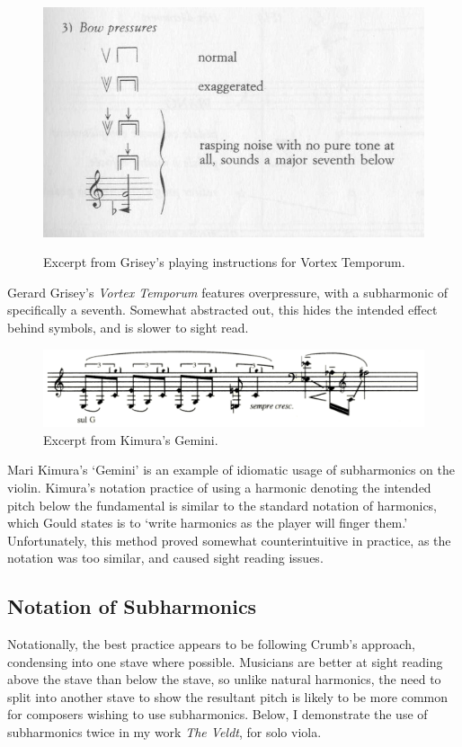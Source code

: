 \begin{figure}
    \includegraphics[width=\linewidth]{./resources/griseyVortexTemporum.jpg}
    \caption{Excerpt from Grisey's playing instructions for Vortex Temporum.}\autocite{griseyVortexTemporum}
\label{fig:Excerpt from Grisey's playing instructions for Vortex Temporum}
  \end{figure}
Gerard Grisey's \emph{Vortex Temporum} features overpressure, with a subharmonic of specifically a seventh. Somewhat abstracted out, this hides the intended effect behind symbols, and is slower to sight read.

\begin{figure}
    \includegraphics[width=\linewidth]{./resources/kimura_gemini.png}
    \caption{Excerpt from Kimura's Gemini.}
\label{fig:Excerpt from Kimura's Gemini}
  \end{figure}
  Mari Kimura's `Gemini' is an example of idiomatic usage of subharmonics on the violin. Kimura's notation practice of using a harmonic denoting the intended pitch below the fundamental is similar to the standard notation of harmonics, which Gould states is to `write harmonics as the player will finger them.'\autocite[413]{gouldBars2011} Unfortunately, this method proved somewhat counterintuitive in practice, as the notation was too similar, and caused sight reading issues.

\subsection{Notation of Subharmonics}
Notationally, the best practice appears to be following Crumb's approach, condensing into one stave where possible. Musicians are better at sight reading above the stave than below the stave, so unlike natural harmonics, the need to split into another stave to show the resultant pitch is likely to be more common for composers wishing to use subharmonics. Below, I demonstrate the use of subharmonics twice in my work \emph{The Veldt}, for solo viola.

